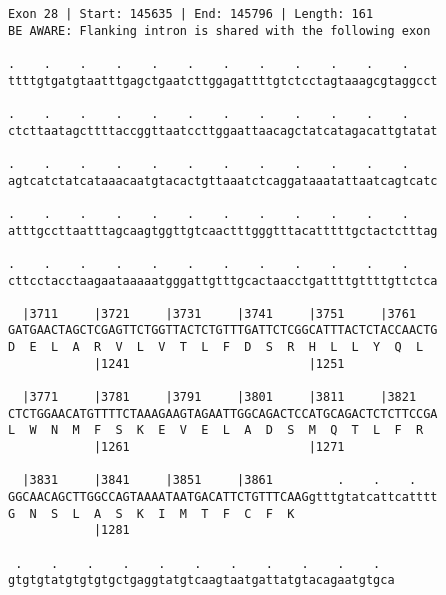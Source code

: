 \documentclass{article}
\begin{document}
\begin{Verbatim}
Exon 28 | Start: 145635 | End: 145796 | Length: 161
BE AWARE: Flanking intron is shared with the following exon
 
.    .    .    .    .    .    .    .    .    .    .    .    
ttttgtgatgtaatttgagctgaatcttggagattttgtctcctagtaaagcgtaggcct
  
.    .    .    .    .    .    .    .    .    .    .    .    
ctcttaatagcttttaccggttaatccttggaattaacagctatcatagacattgtatat
  
.    .    .    .    .    .    .    .    .    .    .    .    
agtcatctatcataaacaatgtacactgttaaatctcaggataaatattaatcagtcatc
  
.    .    .    .    .    .    .    .    .    .    .    .    
atttgccttaatttagcaagtggttgtcaactttgggtttacatttttgctactctttag
  
.    .    .    .    .    .    .    .    .    .    .    .    
cttcctacctaagaataaaaatgggattgtttgcactaacctgattttgttttgttctca
  
  |3711     |3721     |3731     |3741     |3751     |3761   
GATGAACTAGCTCGAGTTCTGGTTACTCTGTTTGATTCTCGGCATTTACTCTACCAACTG
D  E  L  A  R  V  L  V  T  L  F  D  S  R  H  L  L  Y  Q  L  
            |1241                         |1251             
  
  |3771     |3781     |3791     |3801     |3811     |3821   
CTCTGGAACATGTTTTCTAAAGAAGTAGAATTGGCAGACTCCATGCAGACTCTCTTCCGA
L  W  N  M  F  S  K  E  V  E  L  A  D  S  M  Q  T  L  F  R  
            |1261                         |1271             
  
  |3831     |3841     |3851     |3861         .    .    .   
GGCAACAGCTTGGCCAGTAAAATAATGACATTCTGTTTCAAGgtttgtatcattcatttt
G  N  S  L  A  S  K  I  M  T  F  C  F  K                    
            |1281                                           
  
 .    .    .    .    .    .    .    .    .    .    .  
gtgtgtatgtgtgtgctgaggtatgtcaagtaatgattatgtacagaatgtgca
\end{Verbatim}
\newpage
\end{document}
